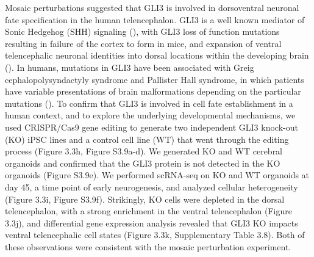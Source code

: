 Mosaic perturbations suggested that GLI3 is involved in dorsoventral neuronal fate specification in the human telencephalon. GLI3 is a well known mediator of Sonic Hedgehog (SHH) signaling (\cite{ruiz_i_altaba_hedgehoggli_2002}), with GLI3 loss of function mutations resulting in failure of the cortex to form in mice, and expansion of ventral telencephalic neuronal identities into dorsal locations within the developing brain (\cite{rallu_dorsoventral_2002,theil_gli3_1999}). In humans, mutations in GLI3 have been associated with Greig cephalopolysyndactyly syndrome and Pallister Hall syndrome, in which patients have variable presentations of brain malformations depending on the particular mutations (\cite{biesecker_greig_2008}). To confirm that GLI3 is involved in cell fate establishment in a human context, and to explore the underlying developmental mechanisms, we used CRISPR/Cas9 gene editing to generate two independent GLI3 knock-out (KO) iPSC lines  and a control cell line (WT) that went through the editing process (Figure 3.3h, Figure S3.9a-d). We generated KO and WT cerebral organoids and confirmed that the GLI3 protein is not detected in the KO organoids (Figure S3.9e). We performed scRNA-seq on KO and WT organoids at day 45, a time point of early neurogenesis, and analyzed cellular heterogeneity (Figure 3.3i, Figure S3.9f). Strikingly, KO cells were depleted in the dorsal telencephalon, with a strong enrichment in the ventral telencephalon (Figure 3.3j), and differential gene expression analysis revealed that GLI3 KO impacts ventral telencephalic cell states (Figure 3.3k, Supplementary Table 3.8). Both of these observations were consistent with the mosaic perturbation experiment.


